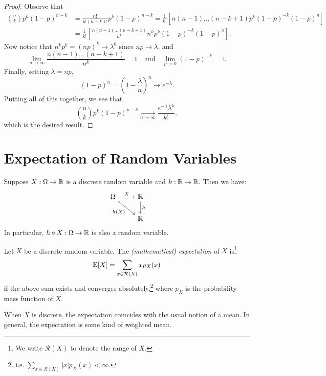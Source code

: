 \begin{proof}
  Observe that
  \begin{align*}
    \binom{n}{k} p^k (1 - p)^{n - k}
    &= \frac{n!}{k!(n - k)!} p^k (1 - p)^{n - k}
    = \frac{1}{k!} \left[n(n - 1) \dots (n - k + 1)p^k(1 - p)^{-k} (1 - p)^n\right] \\
    &= \frac{1}{k!} \left[\frac{n(n - 1) \dots (n - k + 1)}{n^k} n^k p^k (1 - p)^{-k} (1 - p)^n\right].
  \end{align*}
  Now notice that $n^k p^k = (np)^k \to \lambda^k$
  since $np \to \lambda$, and
  \[
    \lim_{n \to \infty} \frac{n(n - 1) \dots (n - k + 1)}{n^k} = 1
    \quad \text{and} \quad
    \lim_{p \to 0} (1 - p)^{-k} = 1.
  \]
  Finally, setting $\lambda = np$,
  \[
    (1 - p)^n =
    \left(1 - \frac{\lambda}{n}\right)^n
    \to e^{-\lambda}.
  \]
  Putting all of this together, we see that
  \[
    \binom{n}{k} p^k (1 - p)^{n - k} \xrightarrow[n \to \infty]{} \frac{e^{-\lambda} \lambda^k}{k!},
  \]
  which is the desired result.
\end{proof}

\section{Expectation of Random Variables}
\begin{remark}
  Suppose $X : \Omega \to \mathbb{R}$ is a discrete random variable and
  $h : \mathbb{R} \to \mathbb{R}$. Then we have:
  \[
    \begin{tikzcd}
      \Omega \ar[r, "X"] \ar[dr, "h(X)", swap] & \R \ar[d, "h"] \\
      & \R
    \end{tikzcd}
  \]
  In particular, $h \circ X : \Omega \to \mathbb{R}$ is
  also a random variable.
\end{remark}

\begin{definition}
  Let $X$ be a discrete random variable. The
  \emph{(mathematical) expectation} of $X$ is\footnote{We write $\mathcal{R}(X)$ to denote the range of $X$.}
  \[
    \mathbb{E}[X] = \sum_{x \in \mathcal{R}(X)} x p_X(x)
  \]
  if the above sum exists and converges
  absolutely,\footnote{i.e. $\sum_{x \in \mathcal{R}(X)} |x| p_X(x) < \infty$.}
  where
  $p_X$ is the probability mass function of $X$.
\end{definition}

\begin{remark}
  When $X$ is discrete, the expectation coincides
  with the usual notion of a mean. In general,
  the expectation is some kind of weighted mean.
\end{remark}

